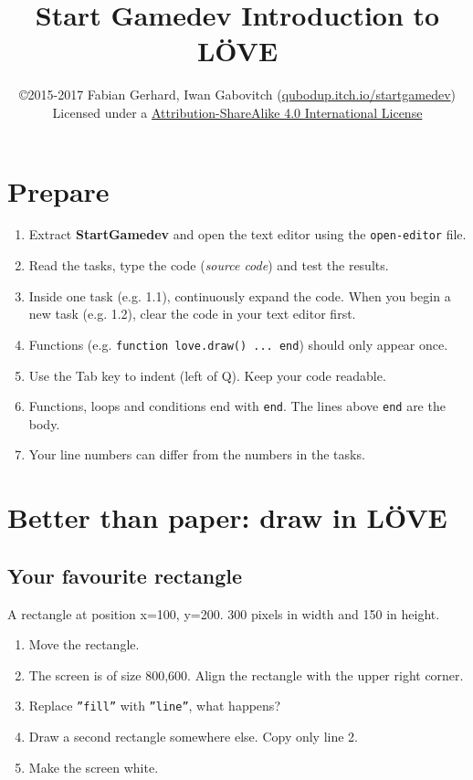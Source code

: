 \documentclass[a4paper, 11pt]{article}
\date{\vspace{-5ex}}
\title{\vspace{-8ex}Start Gamedev Introduction to LÖVE\vspace{-1ex}}
\author{\copyright{}2015-2017 Fabian Gerhard, Iwan Gabovitch (\href{http://qubodup.itch.io/startgamedev}{qubodup.itch.io/startgamedev})\\
Licensed under a \href{http://creativecommons.org/licenses/by-sa/4.0/}{Attribution-ShareAlike 4.0 International License}}
\begin{document}
\maketitle
\thispagestyle{fancy} %

\section{Prepare}

\begin{enumerate}
  \item Extract \textbf{StartGamedev} and open the text editor using the \texttt{open-editor} file.
  \item Read the tasks, type the code (\textit{source code}) and test the results.
  \item Inside one task (e.g. 1.1), continuously expand the code. When you begin a new task (e.g. 1.2), clear the code in your text editor first.
  \item Functions (e.g. \texttt{function love.draw() ... end}) should only appear once.
  \item Use the Tab key to indent (left of Q). Keep your code readable.
  \item Functions, loops and conditions end with \texttt{\texttt{end}}. The lines above \texttt{\texttt{end}} are the body.
  \item Your line numbers can differ from the numbers in the tasks.
\end{enumerate}

\section{Better than paper: draw in LÖVE}

\subsection{Your favourite rectangle}

A rectangle at position x=100, y=200. 300 pixels in width and 150 in height.


\begin{enumerate} 
\item Move the rectangle.
\item The screen is of size 800,600. Align the rectangle with the upper right corner. 
\item Replace \texttt{''fill''} with \texttt{''line''}, what happens?
\item Draw a second rectangle somewhere else. Copy only line 2.
\item Make the screen white.
\end{enumerate}
\end{document}
